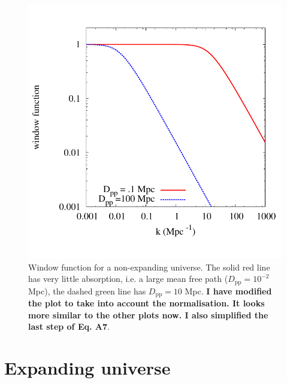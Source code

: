 \documentclass[numberedappendix]{emulateapj}
\newcommand\ALc[1]{{\color{red} \bf #1}} %
\begin{document}
\begin{figure}
\centering
\includegraphics[width = .45\textwidth ]{newtonian_window}
\caption{Window function for a non-expanding universe. The solid red line has very little absorption, i.e. a large mean free path ($D_{\mathrm{pp}}=10^{-2}$ Mpc), the dashed green line has $D_{\mathrm{pp}}=10 $ Mpc.\ALc{I have modified the plot to take into account the normalisation. It looks more similar to the other plots now. I also simplified the last step of Eq. A7}.}
\label{fig:window_newt}
\end{figure}


\section{Expanding universe}\label{sec:window_exp}
\end{document}
